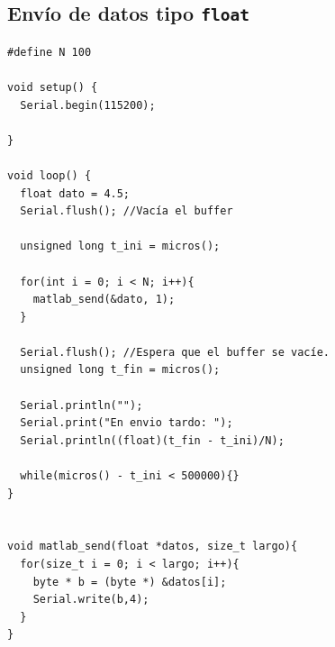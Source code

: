 \documentclass[a4paper,12pt]{article}
\begin{document}
\newpage

\subsection{Envío de datos tipo \texttt{float}}
\label{apendice: código tiempo}

\begin{verbatim}
#define N 100

void setup() {
  Serial.begin(115200);

}

void loop() {
  float dato = 4.5;
  Serial.flush(); //Vacía el buffer

  unsigned long t_ini = micros();

  for(int i = 0; i < N; i++){
    matlab_send(&dato, 1);
  }

  Serial.flush(); //Espera que el buffer se vacíe. 
  unsigned long t_fin = micros();
  
  Serial.println("");
  Serial.print("En envio tardo: ");
  Serial.println((float)(t_fin - t_ini)/N);

  while(micros() - t_ini < 500000){}
}


void matlab_send(float *datos, size_t largo){
  for(size_t i = 0; i < largo; i++){
    byte * b = (byte *) &datos[i];
    Serial.write(b,4);
  }
}
\end{verbatim}
\end{document}
